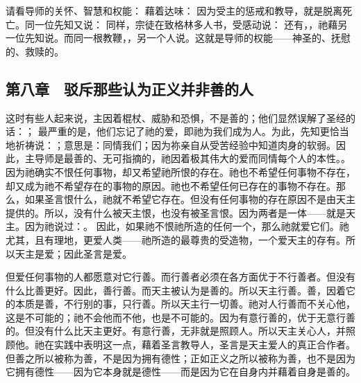 请看导师的关怀、智慧和权能： 藉着达味： 因为受主的惩戒和教导，就是脱离死亡。同一位先知又说： 同样，宗徒在致格林多人书，受感动说：  还有，，祂藉另一位先知说。而同一根教鞭，，另一个人说。这就是导师的权能——神圣的、抚慰的、救赎的。\par


\subsection{第八章　驳斥那些认为正义并非善的人}

这时有些人起来说，主因着棍杖、威胁和恐惧，不是善的；他们显然误解了圣经的话：； 最严重的是，他们忘记了祂的爱，即祂为我们成为人。为此，先知更恰当地祈祷说：；意思是：同情我们；因为祢亲自从受苦经验中知道肉身的软弱。因此，主导师是最善的、无可指摘的，祂因着极其伟大的爱而同情每个人的本性。。 因为祂确实不恨任何事物，却又希望祂所恨的存在。祂也不希望任何事物不存在，却又成为祂不希望存在的事物的原因。祂也不希望任何已存在的事物不存在。那么，如果圣言恨什么，祂就不希望它存在。但没有任何事物的存在原因不是由天主提供的。所以，没有什么被天主恨，也没有被圣言恨。因为两者是一体——就是天主。因为祂说过：。 因此，如果祂不恨祂所造的任何一个，那么祂就爱它们。祂尤其，且有理地，更爱人类——祂所造的最尊贵的受造物，一个爱天主的存有。所以天主是爱；因此圣言是爱。\par

但爱任何事物的人都愿意对它行善。而行善者必须在各方面优于不行善者。但没有什么比善更好。因此，善行善。而天主被认为是善的。所以天主行善。善，因着它的本质是善，不行别的事，只行善。所以天主行一切善。祂对人行善而不关心他，这是不可能的；祂不会他而不他，也是不可能的。因为有意行善的，优于无意行善的。但没有什么比天主更好。有意行善，无非就是照顾人。所以天主关心人，并照顾他。祂在实践中表明这一点，藉着圣言教导人，圣言是天主爱人的真正合作者。但善之所以被称为善，不是因为拥有德性；正如正义之所以被称为善，也不是因为它拥有德性——因为它本身就是德性——而是因为它在自身内并藉着自身是善的。\par

